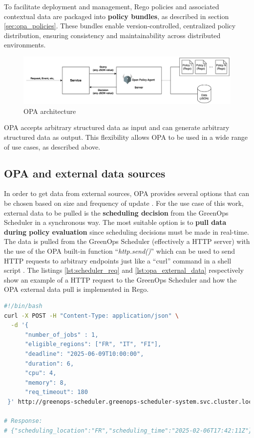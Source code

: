To facilitate deployment and management, Rego policies and associated contextual data are packaged into \textbf{policy bundles}, as described in section \ref{sec:opa_policies}. These bundles enable version-controlled, centralized policy distribution, ensuring consistency and maintainability across distributed environments. \newline


\begin{figure}[htb]
\centering
\includegraphics[width=1\linewidth]{images/OPA.png}
\caption{OPA architecture}
\label{fig:opa_architecture}
\end{figure}


OPA accepts arbitrary structured data as input and can generate arbitrary structured data as output. 
This flexibility allows OPA to be used in a wide range of use cases, as described above.

\subsection{OPA and external data sources}
\label{sec:opa_external_data}

In order to get data from external sources, OPA provides several options that can be chosen based on size and frequency of update \cite{opa_external_data}.
For the use case of this work, external data to be pulled is the \textbf{scheduling decision} from the GreenOps Scheduler in a synchronous way.
The most suitable option is to \textbf{pull data during policy evaluation} since scheduling decisions must be made in real-time.
The data is pulled from the GreenOps Scheduler (effectively a HTTP server) with the use of the OPA built-in function ``\textit{http.send()}'' which can be used to send HTTP requests to arbitrary endpoints just like a ``curl'' command in a shell script \cite{opa_external_data}.
The listings \ref{lst:scheduler_req} and \ref{lst:opa_external_data} respectively show an example of a HTTP request to the GreenOps Scheduler and how the OPA external data pull is implemented in Rego.

\begin{lstlisting}[language=sh, caption={GreenOps scheduler HTTP request example}, label={lst:scheduler_req}]
#!/bin/bash
curl -X POST -H "Content-Type: application/json" \
  -d '{
      "number_of_jobs" : 1,
      "eligible_regions": ["FR", "IT", "FI"],
      "deadline": "2025-06-09T10:00:00",
      "duration": 6,
      "cpu": 4,
      "memory": 8,
      "req_timeout": 180
 }' http://greenops-scheduler.greenops-scheduler-system.svc.cluster.local/scheduling

# Response: 
# {"scheduling_location":"FR","scheduling_time":"2025-02-06T17:42:11Z"}
\end{lstlisting}


